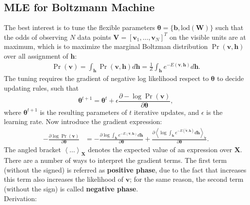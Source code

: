 \documentclass[11pt]{article}
\newcommand{\mean}[2]{\left\langle{#1}\right\rangle_{#2}}
\newcommand{\vb}{\boldsymbol{b}}
\newcommand{\vh}{\boldsymbol{h}}
\newcommand{\vv}{\boldsymbol{v}}
\newcommand{\mv}{\boldsymbol{V}}
\newcommand{\mw}{\boldsymbol{W}}
\newcommand{\mx}{\boldsymbol{X}}
\newcommand{\vvt}{\tilde{\vv}}
\newcommand{\pEC}{\boldsymbol{\theta}}
\newcommand{\PDV}[2]{\frac{\partial #1}{\partial #2}}
\begin{document}
\subsection{MLE for Boltzmann Machine}
The best interest is to tune the flexible parameters $\pEC=\{\vb, \textrm{lod}(\mw)\}$ such that the odds of observing $N$ data points $\mv=[\vv_1, \dots, \vv_N]^T$ on the visible units are at maximum, which is to maximize the marginal Boltzman distribution $\Pr(\vv, \vh)$ over all assignment of $\vh$:
\begin{equation} \label{eq:p(v)}  %
  \begin{split}
    \Pr(\vv) = \int_{\vh}{\Pr(\vv, \vh)d\vh} = \frac{1}{Z} \int_{\vh}{e^{-E(\vv, \vh)}d\vh}.
  \end{split}
\end{equation}
The tuning requires the gradient of negative log likelihood respect to $\pEC$ to decide updating rules, such that
\[ \pEC^{t+1} = \pEC^t + \epsilon \PDV{-\log{\Pr(\vv)}}{\pEC}, \]
where $\pEC^{t+1}$ is the resulting parameters of $t$ iterative updates, and $\epsilon$ is the learning rate. Now introduce the gradient expression:
\begin{align}\label{eq:gv1}
  -\PDV{\log{\Pr(\vv)}}{\pEC} &= -\PDV{\log{\int_{\vh}{e^{-E(\vv, \vh)}d\vh}}}{\pEC} + \PDV{\mean{\log{\int_{\vh}{e^{-E(\vvt, \vh)}d\vh}}}{\vvt}}{\pEC}.
\end{align}
The angled bracket $\mean{\dots}{\mx}$ denotes the expected value of an expression over $\mx$.
There are a number of ways to interpret the gradient terms. The first term (without the signed) is referred as \textbf{positive phase}, due to the fact that increases this term also increases the likelihood of $\vv$; for the same reason, the second term (without the sign) is called \textbf{negative phase}.\\
Derivation:
\end{document}
